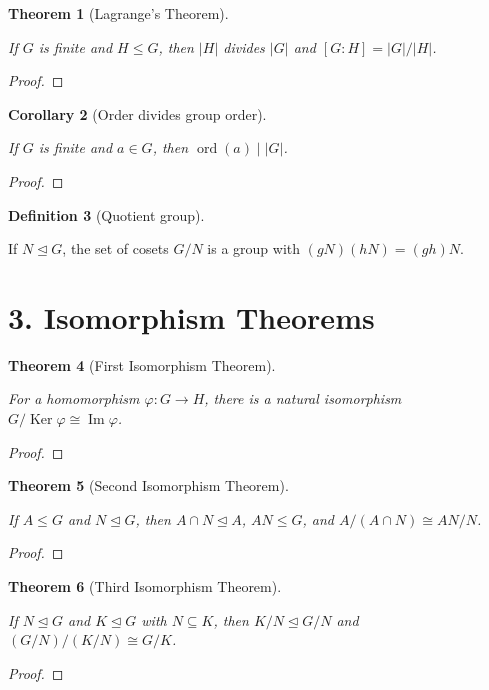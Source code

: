 \documentclass[11pt,letterpaper]{article}
\newtheorem{theorem}{Theorem}
\newtheorem{corollary}[theorem]{Corollary}
\theoremstyle{definition}
\newtheorem{definition}[theorem]{Definition}
\theoremstyle{remark}
\newcommand{\Ker}{\operatorname{Ker}}
\newcommand{\Img}{\operatorname{Im}}
\newcommand{\uses}[1]{}
\begin{document}
\begin{theorem}[Lagrange's Theorem]\label{thm:lagrange}
\uses{def:group,def:subgroup,def:coset_index}
If $G$ is finite and $H\le G$, then $|H|$ divides $|G|$ and $[G:H]=|G|/|H|$.
\end{theorem}
\begin{proof}\end{proof}

\begin{corollary}[Order divides group order]\label{cor:order_divides}
\uses{def:order}
If $G$ is finite and $a\in G$, then $\operatorname{ord}(a)\mid |G|$.
\end{corollary}
\begin{proof}\uses{thm:lagrange}\end{proof}

\begin{definition}[Quotient group]\label{def:quotient}
\uses{def:group,def:subgroup,def:normal_subgroup}
If $N\trianglelefteq G$, the set of cosets $G/N$ is a group with $(gN)(hN)=(gh)N$.
\end{definition}

\section*{3. Isomorphism Theorems}

\begin{theorem}[First Isomorphism Theorem]\label{thm:first_iso}
\uses{def:homomorphism, prop:kernel_image, def:quotient}
For a homomorphism $\varphi:G\to H$, there is a natural isomorphism $G/\Ker\varphi\cong \Img\varphi$.
\end{theorem}
\begin{proof}\end{proof}

\begin{theorem}[Second Isomorphism Theorem]\label{thm:second_iso}
\uses{def:subgroup, def:normal_subgroup, def:quotient}
If $A\le G$ and $N\trianglelefteq G$, then $A\cap N\trianglelefteq A$, $AN\le G$, and $A/(A\cap N)\cong AN/N$.
\end{theorem}
\begin{proof}\end{proof}

\begin{theorem}[Third Isomorphism Theorem]\label{thm:third_iso}
\uses{def:normal_subgroup, def:quotient}
If $N\trianglelefteq G$ and $K\trianglelefteq G$ with $N\subseteq K$, then $K/N\trianglelefteq G/N$ and $(G/N)/(K/N)\cong G/K$.
\end{theorem}
\begin{proof}\end{proof}
\end{document}
